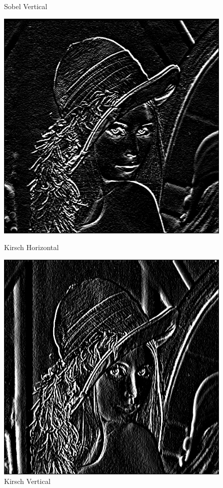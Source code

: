 \documentclass[11pt]{article}
\begin{document}
\begin{figure}[H]
\begin{minipage}[c]{.46\linewidth}
			\caption{Sobel Vertical}
			\label{fig:SobelVertical}
		\end{minipage}
		\begin{minipage}[c]{.46\linewidth}
			\centering
			\includegraphics[scale=0.25]{Image/filtreKirschHorizontal.png}
			\caption{Kirsch Horizontal}
			\label{fig:KirschHorizontal}
		\end{minipage} \hfill
		\begin{minipage}[c]{.46\linewidth}
		\centering
			\includegraphics[scale=0.25]{Image/filtreKirschVertical.png}
			\caption{Kirsch Vertical}
			\label{fig:KirschVertical}
		\end{minipage}
	\end{figure}
\end{document}
